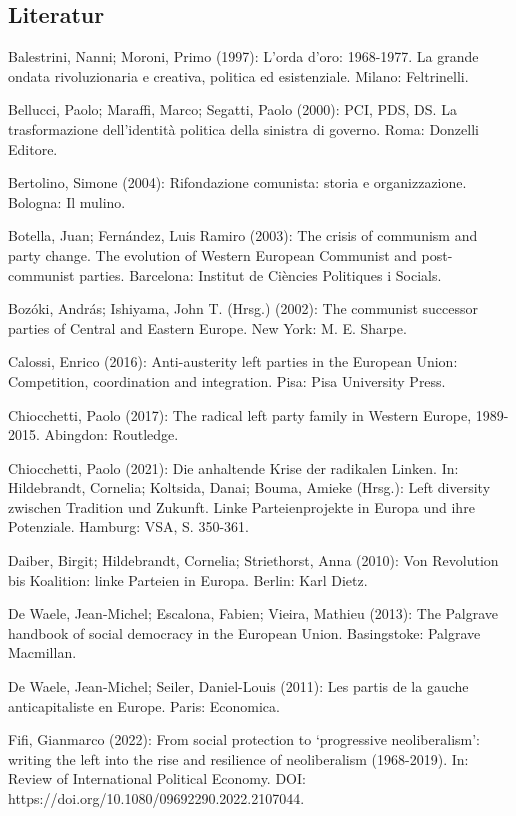 \begin{multicols*}{2}
\printendnotes[custom]
\section{Literatur}
    \begin{bibdescription}
        \item Balestrini, Nanni; Moroni, Primo (1997): L’orda d’oro: 1968-1977. La grande ondata rivoluzionaria e creativa, politica ed esistenziale. Milano: Feltrinelli.
        \item Bellucci, Paolo; Maraffi, Marco; Segatti, Paolo (2000): PCI, PDS, DS. La trasformazione dell’identità politica della sinistra di governo. Roma: Donzelli Editore.
        \item Bertolino, Simone (2004): Rifondazione comunista: storia e organizzazione. Bologna: Il mulino.
        \item Botella, Juan; Fernández, Luis Ramiro (2003): The crisis of communism and party change. The evolution of Western European Communist and post-communist parties. Barcelona: Institut de Ciències Politiques i Socials.
        \item Bozóki, András; Ishiyama, John T. (Hrsg.) (2002): The communist successor parties of Central and Eastern Europe. New York: M. E. Sharpe.
        \item Calossi, Enrico (2016): Anti-austerity left parties in the European Union: Competition, coordination and integration. Pisa: Pisa University Press.
        \item Chiocchetti, Paolo (2017): The radical left party family in Western Europe, 1989-2015. Abingdon: Routledge.
        \item Chiocchetti, Paolo (2021): Die anhaltende Krise der radikalen Linken. In: Hildebrandt, Cornelia; Koltsida, Danai; Bouma, Amieke (Hrsg.): Left diversity zwischen Tradition und Zukunft. Linke Parteienprojekte in Europa und ihre Potenziale. Hamburg: VSA, S. 350-361.
        \item Daiber, Birgit; Hildebrandt, Cornelia; Striethorst, Anna (2010): Von Revolution bis Koalition: linke Parteien in Europa. Berlin: Karl Dietz.
        \item De Waele, Jean-Michel; Escalona, Fabien; Vieira, Mathieu (2013): The Palgrave handbook of social democracy in the European Union. Basingstoke: Palgrave Macmillan.
        \item De Waele, Jean-Michel; Seiler, Daniel-Louis (2011): Les partis de la gauche anticapitaliste en Europe. Paris: Economica.
        \item Fifi, Gianmarco (2022): From social protection to ‘progressive neoliberalism’: writing the left into the rise and resilience of neoliberalism (1968-2019). In: Review of International Political Economy. DOI: https://doi.org/10.1080/09692290.2022.2107044.

\end{bibdescription}
\end{multicols*}
